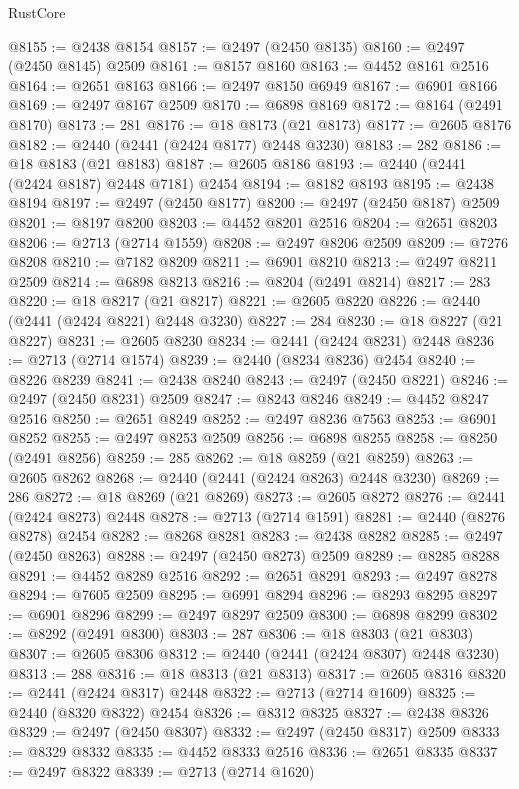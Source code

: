 \begin{lexlean}{RustCore}
\begin{coremodule}
@8155 := @2438 @8154
@8157 := @2497 (@2450 @8135)
@8160 := @2497 (@2450 @8145) @2509
@8161 := @8157 @8160
@8163 := @4452 @8161 @2516
@8164 := @2651 @8163
@8166 := @2497 @8150 @6949
@8167 := @6901 @8166
@8169 := @2497 @8167 @2509
@8170 := @6898 @8169
@8172 := @8164 (@2491 @8170)
@8173 := 281
@8176 := @18 @8173 (@21 @8173)
@8177 := @2605 @8176
@8182 := @2440 (@2441 (@2424 @8177) @2448 @3230)
@8183 := 282
@8186 := @18 @8183 (@21 @8183)
@8187 := @2605 @8186
@8193 := @2440 (@2441 (@2424 @8187) @2448 @7181) @2454
@8194 := @8182 @8193
@8195 := @2438 @8194
@8197 := @2497 (@2450 @8177)
@8200 := @2497 (@2450 @8187) @2509
@8201 := @8197 @8200
@8203 := @4452 @8201 @2516
@8204 := @2651 @8203
@8206 := @2713 (@2714 @1559)
@8208 := @2497 @8206 @2509
@8209 := @7276 @8208
@8210 := @7182 @8209
@8211 := @6901 @8210
@8213 := @2497 @8211 @2509
@8214 := @6898 @8213
@8216 := @8204 (@2491 @8214)
@8217 := 283
@8220 := @18 @8217 (@21 @8217)
@8221 := @2605 @8220
@8226 := @2440 (@2441 (@2424 @8221) @2448 @3230)
@8227 := 284
@8230 := @18 @8227 (@21 @8227)
@8231 := @2605 @8230
@8234 := @2441 (@2424 @8231) @2448
@8236 := @2713 (@2714 @1574)
@8239 := @2440 (@8234 @8236) @2454
@8240 := @8226 @8239
@8241 := @2438 @8240
@8243 := @2497 (@2450 @8221)
@8246 := @2497 (@2450 @8231) @2509
@8247 := @8243 @8246
@8249 := @4452 @8247 @2516
@8250 := @2651 @8249
@8252 := @2497 @8236 @7563
@8253 := @6901 @8252
@8255 := @2497 @8253 @2509
@8256 := @6898 @8255
@8258 := @8250 (@2491 @8256)
@8259 := 285
@8262 := @18 @8259 (@21 @8259)
@8263 := @2605 @8262
@8268 := @2440 (@2441 (@2424 @8263) @2448 @3230)
@8269 := 286
@8272 := @18 @8269 (@21 @8269)
@8273 := @2605 @8272
@8276 := @2441 (@2424 @8273) @2448
@8278 := @2713 (@2714 @1591)
@8281 := @2440 (@8276 @8278) @2454
@8282 := @8268 @8281
@8283 := @2438 @8282
@8285 := @2497 (@2450 @8263)
@8288 := @2497 (@2450 @8273) @2509
@8289 := @8285 @8288
@8291 := @4452 @8289 @2516
@8292 := @2651 @8291
@8293 := @2497 @8278
@8294 := @7605 @2509
@8295 := @6991 @8294
@8296 := @8293 @8295
@8297 := @6901 @8296
@8299 := @2497 @8297 @2509
@8300 := @6898 @8299
@8302 := @8292 (@2491 @8300)
@8303 := 287
@8306 := @18 @8303 (@21 @8303)
@8307 := @2605 @8306
@8312 := @2440 (@2441 (@2424 @8307) @2448 @3230)
@8313 := 288
@8316 := @18 @8313 (@21 @8313)
@8317 := @2605 @8316
@8320 := @2441 (@2424 @8317) @2448
@8322 := @2713 (@2714 @1609)
@8325 := @2440 (@8320 @8322) @2454
@8326 := @8312 @8325
@8327 := @2438 @8326
@8329 := @2497 (@2450 @8307)
@8332 := @2497 (@2450 @8317) @2509
@8333 := @8329 @8332
@8335 := @4452 @8333 @2516
@8336 := @2651 @8335
@8337 := @2497 @8322
@8339 := @2713 (@2714 @1620)

\end{coremodule}
\end{lexlean}
